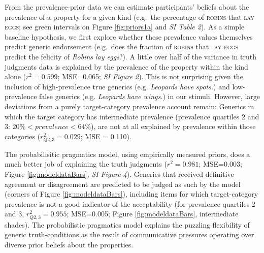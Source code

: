 \documentclass{pnastwo}
\begin{document}
\begin{article}
From the prevalence-prior data we can estimate participants' beliefs about the prevalence of a property for a given kind (e.g.~the percentage of \textsc{robins} that \textsc{lay eggs}; see green intervals on Figure \ref{fig:priors1a} and \emph{SI Table 2}).
As a simple baseline hypothesis, we first explore whether these prevalence values themselves predict generic endorsement (e.g.~does the fraction of \textsc{robins} that \textsc{lay eggs} predict the felicity of \emph{Robins lay eggs}?).
A little over half of the variance in truth judgments data is explained by the prevalence of the property within the kind alone ($r^2 = 0.599$; MSE=0.065; \emph{SI Figure 2}). 
This is not surprising given the inclusion of high-prevalence true generics (e.g. \emph{Leopards have spots.}) and low-prevalence false generics (e.g. \emph{Leopards have wings.}) in our stimuli. 
However, large deviations from a purely target-category prevalence account remain: Generics in which the target category has intermediate prevalence (prevalence quartiles 2 and 3: $ 20\% < prevalence < 64\%$), are not at all explained by prevalence within those categories ($r_{Q2,3}^2 = 0.029$; MSE = 0.110).




The probabilisitic pragmatics model, using empirically measured priors, does a much better job of explaining the truth judgments ($r^2=0.981$; MSE=0.003; Figure \ref{fig:modeldataBars}, {\it SI Figure 4}). 
Generics that received definitive agreement or disagreement are predicted to be judged as such by the model (corners of Figure \ref{fig:modeldataBars}), including items for which target-category prevalence is not a good indicator of the acceptability (for prevalence quartiles 2 and 3, $r_{Q2,3}^2=0.955$; MSE=0.005; Figure \ref{fig:modeldataBars}, intermediate shades).
The probabilistic pragmatics model explains the puzzling flexibility of generic truth-conditions as the result of communicative pressures operating over diverse prior beliefs about the properties. 


\end{article}
\end{document}
